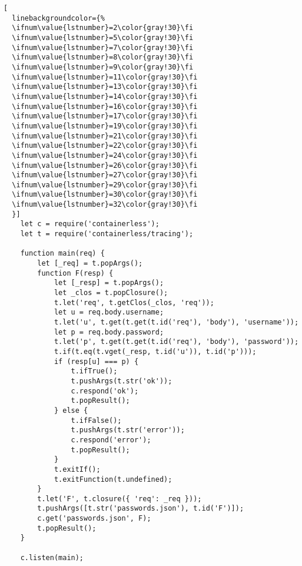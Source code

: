 \documentclass[sigplan,10pt,review=false,nonacm=true]{acmart}
\begin{document}
\begin{figure*}
\lstset{language=JavaScript}
\begin{lstlisting}[
  linebackgroundcolor={%
  \ifnum\value{lstnumber}=2\color{gray!30}\fi
  \ifnum\value{lstnumber}=5\color{gray!30}\fi
  \ifnum\value{lstnumber}=7\color{gray!30}\fi
  \ifnum\value{lstnumber}=8\color{gray!30}\fi
  \ifnum\value{lstnumber}=9\color{gray!30}\fi
  \ifnum\value{lstnumber}=11\color{gray!30}\fi
  \ifnum\value{lstnumber}=13\color{gray!30}\fi
  \ifnum\value{lstnumber}=14\color{gray!30}\fi
  \ifnum\value{lstnumber}=16\color{gray!30}\fi
  \ifnum\value{lstnumber}=17\color{gray!30}\fi
  \ifnum\value{lstnumber}=19\color{gray!30}\fi
  \ifnum\value{lstnumber}=21\color{gray!30}\fi
  \ifnum\value{lstnumber}=22\color{gray!30}\fi
  \ifnum\value{lstnumber}=24\color{gray!30}\fi
  \ifnum\value{lstnumber}=26\color{gray!30}\fi
  \ifnum\value{lstnumber}=27\color{gray!30}\fi
  \ifnum\value{lstnumber}=29\color{gray!30}\fi
  \ifnum\value{lstnumber}=30\color{gray!30}\fi
  \ifnum\value{lstnumber}=32\color{gray!30}\fi
  }]
    let c = require('containerless');
    let t = require('containerless/tracing');

    function main(req) {
        let [_req] = t.popArgs();
        function F(resp) {
            let [_resp] = t.popArgs();
            let _clos = t.popClosure();
            t.let('req', t.getClos(_clos, 'req'));
            let u = req.body.username;
            t.let('u', t.get(t.get(t.id('req'), 'body'), 'username'));
            let p = req.body.password;
            t.let('p', t.get(t.get(t.id('req'), 'body'), 'password'));
            t.if(t.eq(t.vget(_resp, t.id('u')), t.id('p')));
            if (resp[u] === p) {
                t.ifTrue();
                t.pushArgs(t.str('ok'));
                c.respond('ok');
                t.popResult();
            } else {
                t.ifFalse();
                t.pushArgs(t.str('error'));
                c.respond('error');
                t.popResult();
            }
            t.exitIf();
            t.exitFunction(t.undefined);
        }
        t.let('F', t.closure({ 'req': _req }));
        t.pushArgs([t.str('passwords.json'), t.id('F')]);
        c.get('passwords.json', F);
        t.popResult();
    }

    c.listen(main);
\end{lstlisting}

\label{login-example-instrumented}

\end{figure*}
\end{document}

